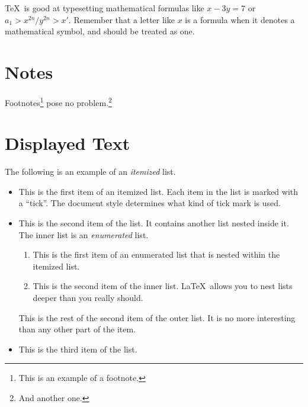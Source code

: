\documentclass{river-journal}
\begin{document}
\TeX\ is good at typesetting mathematical formulas like
       \( x-3y = 7 \)
or
       \( a_{1} > x^{2n} / y^{2n} > x' \).
Remember that a letter like
       $x$        %
is a formula when it denotes a mathematical symbol, and should
be treated as one.


\section{Notes}
Footnotes\footnote{This is an example of a footnote.}
pose no problem.\footnote{And another one.}


\section{Displayed Text}

The following is an example of an {\em itemized} list.
\begin{itemize}
\item  This is the first item of an itemized list.  Each item
      in the list is marked with a ``tick''.  The document
      style determines what kind of tick mark is used.
\item  This is the second item of the list.  It contains another
      list nested inside it.  The inner list is an {\em enumerated}
      list.
    \begin{enumerate}
       \item This is the first item of an enumerated list that
            is nested within the itemized list.
          \item This is the second item of the inner list.  \LaTeX\
            allows you to nest lists deeper than you really should.
      \end{enumerate}
      This is the rest of the second item of the outer list.  It
      is no more interesting than any other part of the item.
   \item  This is the third item of the list.
\end{itemize}
\end{document}
